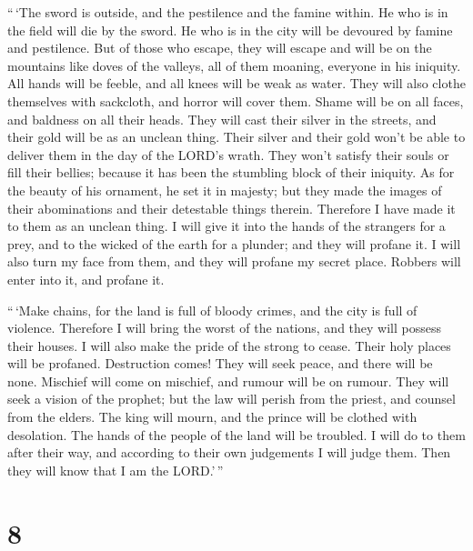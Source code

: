  ``\,`The sword is outside, and the pestilence and the
famine within. He who is in the field will die by the sword. He who is
in the city will be devoured by famine and pestilence.  But
of those who escape, they will escape and will be on the mountains like
doves of the valleys, all of them moaning, everyone in his iniquity.
 All hands will be feeble, and all knees will be weak as
water.  They will also clothe themselves with sackcloth,
and horror will cover them. Shame will be on all faces, and baldness on
all their heads.  They will cast their silver in the
streets, and their gold will be as an unclean thing. Their silver and
their gold won't be able to deliver them in the day of the LORD's wrath.
They won't satisfy their souls or fill their bellies; because it has
been the stumbling block of their iniquity.  As for the
beauty of his ornament, he set it in majesty; but they made the images
of their abominations and their detestable things therein. Therefore I
have made it to them as an unclean thing.  I will give it
into the hands of the strangers for a prey, and to the wicked of the
earth for a plunder; and they will profane it.  I will also
turn my face from them, and they will profane my secret place. Robbers
will enter into it, and profane it.

 ``\,`Make chains, for the land is full of bloody crimes,
and the city is full of violence.  Therefore I will bring
the worst of the nations, and they will possess their houses. I will
also make the pride of the strong to cease. Their holy places will be
profaned.  Destruction comes! They will seek peace, and
there will be none.  Mischief will come on mischief, and
rumour will be on rumour. They will seek a vision of the prophet; but
the law will perish from the priest, and counsel from the elders.
 The king will mourn, and the prince will be clothed with
desolation. The hands of the people of the land will be troubled. I will
do to them after their way, and according to their own judgements I will
judge them. Then they will know that I am the LORD.'\,''

\hypertarget{section-6}{%
\section{8}\label{section-6}}

